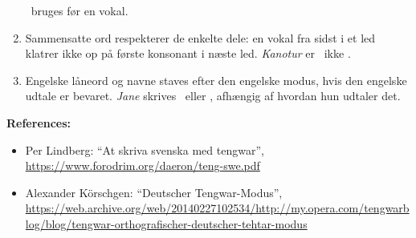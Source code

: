 \documentclass[a4paper]{article}
\begin{document}
\begin{enumerate}
  ~bruges før en vokal.
\item  Sammensatte ord respekterer de enkelte dele: en vokal fra sidst
  i et led klatrer ikke op på første konsonant i næste led. \emph{Kanotur} er
  \Tquesse\Tnuumen\TTthreedots\Ttelco\TTrightcurl
  \Ttinco\Toore\TTleftcurl ~ikke
  \Tquesse\Tnuumen\TTthreedots\Ttinco\TTrightcurl\Toore\TTleftcurl.
\item Engelske låneord og navne staves efter den engelske modus, hvis
  den engelske udtale er bevaret.  \emph{Jane} skrives
  \Tanga\Tnuumen\TTthreedots\TTdotbelow ~eller
  \Tanna\Tnuumen\TTthreedots\Ttelco\TTacute, afhængig af hvordan hun
  udtaler det.
\end{enumerate}

{\Large \textbf{References:}\par}
\begin{itemize}
\item Per Lindberg: ``At skriva svenska med tengwar'',
  \url{https://www.forodrim.org/daeron/teng-swe.pdf}
\item Alexander K\"orschgen: ``Deutscher Tengwar-Modus'',\\
  \url{https://web.archive.org/web/20140227102534/http://my.opera.com/tengwarblog/blog/tengwar-orthografischer-deutscher-tehtar-modus}
\end{itemize}
\end{document}
